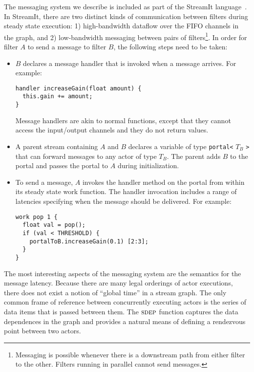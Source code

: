The messaging system we describe is included as part of the StreamIt
language~\cite{streamitcc}.  In StreamIt, there are two distinct kinds
of communication between filters during steady state execution: 1)
high-bandwidth dataflow over the FIFO channels in the graph, and 2)
low-bandwidth messaging between pairs of filters\footnote{Messaging
is possible whenever there is a downstream path from either filter to
the other.  Filters running in parallel cannot send messages.}.  In
order for filter $A$ to send a message to filter $B$, the following
steps need to be taken:
\begin{itemize}

\item $B$ declares a message handler that is invoked when a
message arrives.  For example:
{\small
\begin{verbatim}
handler increaseGain(float amount) {
  this.gain += amount;
}
\end{verbatim}
}
Message handlers are akin to normal functions, except that they
cannot access the input/output channels and they do not return values.

\item A parent stream containing $A$ and $B$ declares a variable
of type {\tt portal<} $T_B$ {\tt >} that can forward messages to
any actor of type $T_B$.  The parent adds $B$ to the portal and passes
the portal to $A$ during initialization.

\item To send a message, $A$ invokes the handler method on the portal
from within its steady state work function. The handler invocation
includes a range of latencies specifying when the message should be
delivered.  For example:
{\small
\begin{verbatim}
work pop 1 {
  float val = pop();
  if (val < THRESHOLD) {
    portalToB.increaseGain(0.1) [2:3];
  }
}
\end{verbatim}}

\end{itemize}
The most interesting aspects of the messaging system are the semantics
for the message latency.  Because there are many legal orderings of actor
executions, there does not exist a notion of ``global time'' in a stream graph.
The only common frame of reference between concurrently executing
actors is the series of data items that is passed between them.  The
$\textsc{sdep}$ function captures the data dependences in the graph and
provides a natural means of defining a rendezvous point between two
actors.

